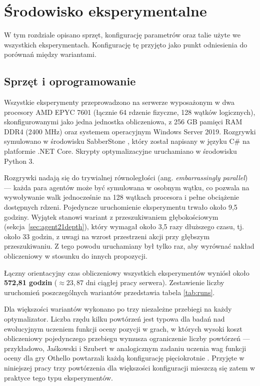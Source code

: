 \section{Środowisko eksperymentalne} \label{sec:setup}

W tym rozdziale opisano sprzęt, konfigurację parametrów oraz talie użyte we wszystkich eksperymentach. Konfigurację tę przyjęto jako punkt odniesienia do porównań między wariantami.

\subsection{Sprzęt i oprogramowanie}

Wszystkie eksperymenty przeprowadzono na serwerze wyposażonym w dwa procesory AMD EPYC 7601 (łącznie 64 rdzenie fizyczne, 128 wątków logicznych), skonfigurowanymi jako jedna jednostka obliczeniowa, z 256 GB pamięci RAM DDR4 (2400 MHz) oraz systemem operacyjnym Windows Server 2019. Rozgrywki symulowano w środowisku SabberStone \cite{sabberstone_github}, który został napisany w języku C\# na platformie .NET Core. Skrypty optymalizacyjne uruchamiano w środowisku Python 3.

Rozgrywki nadają się do trywialnej równoległości (ang. \textit{embarrassingly parallel}) --- każda para agentów może być symulowana w osobnym wątku, co pozwala na wywoływanie walk jednocześnie na 128 wątkach procesora i pełne obciążenie dostępnych rdzeni. Pojedyncze uruchomienie eksperymentu trwało około 9,5 godziny. Wyjątek stanowi wariant z przeszukiwaniem głębokościowym (sekcja~\ref{sec:agent21depth}), który wymagał około 3,5 razy dłuższego czasu, tj. około 33 godzin, z uwagi na wzrost przestrzeni akcji przy głębszym przeszukiwaniu. Z tego powodu uruchamiany był tylko raz, aby wyrównać nakład obliczeniowy w stosunku do innych propozycji.

Łączny orientacyjny czas obliczeniowy wszystkich eksperymentów wyniósł około \textbf{572,81 godzin} ($\approx 23,87$ dni ciągłej pracy serwera). Zestawienie liczby uruchomień poszczególnych wariantów przedstawia tabela \ref{tab:runs}.

Dla większości wariantów wykonano po trzy niezależne przebiegi na każdy optymalizator. Liczba rzędu kilku powtórzeń jest typowa dla badań nad ewolucyjnym uczeniem funkcji oceny pozycji w grach, w których wysoki koszt obliczeniowy pojedynczego przebiegu wymusza ograniczenie liczby powtórzeń — przykładowo, Jaśkowski i Szubert w analogicznym zadaniu uczenia wag funkcji oceny dla gry Othello powtarzali każdą konfigurację pięciokrotnie \cite{jaskowski2016}. Przyjęte w niniejszej pracy trzy powtórzenia dla większości konfiguracji mieszczą się zatem w praktyce tego typu eksperymentów.

